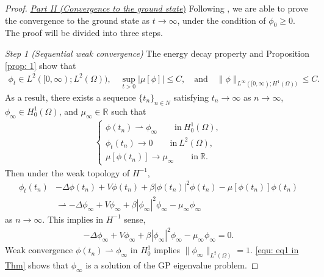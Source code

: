 \documentclass{siamart250211}
\def\R{\mathbb{R}}
\begin{document}
\begin{proof}
\underline{\textit{Part II (Convergence to the ground state})} Following \cite[Proposition 4.1, Corollary 4.2, and Theorem 4.3]{antonelli2024existence}, we are able to prove the convergence to the ground state as $t \to \infty$, under the condition of $\phi_0\geq 0$. The proof will be divided into three steps.

\textit{Step 1 (Sequential weak convergence)} The energy decay property and Proposition \ref{prop: 1} show that
\begin{align*}
    \phi_t\in L^2([0,\infty);L^2(\Omega)), \quad 
    \sup_{t>0}|\mu[\phi]|\leq C, \quad 
    \text{and} \quad \|\phi\|_{L^\infty([0,\infty);H^1(\Omega))} \le C.
\end{align*}
As a result, there exists a sequence $\{ t_n\}_{n\in N}$ satisfying $t_n\to \infty $ as $n\to \infty$, $\phi_{\infty} \in H_0^1(\Omega)$, and $\mu_{\infty} \in \R$ such that
\begin{align*}
    \begin{cases}
        \phi(t_n)\rightharpoonup \phi_{\infty} \qquad\text{in} \ H_0^1(\Omega), \\
        \phi_t(t_n) \to 0  \qquad\text{in} \ L^2(\Omega), \\
        \mu[\phi(t_n)]  \to \mu_{\infty} \qquad \text{in} \ \R.
    \end{cases}
\end{align*}
Then under the weak topology of $H^{-1}$, 
\begin{align*}
    \phi_t(t_n)& - \Delta\phi(t_n) + V\phi(t_n) + \beta|\phi(t_n)|^2\phi(t_n) - \mu[\phi(t_n)]\phi(t_n) \\
    & \rightharpoonup - \Delta\phi_{\infty} + V\phi_{\infty} + \beta|\phi_{\infty}|^2\phi_{\infty} - \mu_{\infty}\phi_{\infty}
\end{align*}
as $n \to \infty$. This implies in $H^{-1}$ sense, 
\begin{align}\label{equ: eq1 in Thm}
    - \Delta\phi_{\infty} + V\phi_{\infty} + \beta|\phi_{\infty}|^2\phi_{\infty} - \mu_{\infty}\phi_{\infty} = 0.
\end{align}
Weak convergence $\phi(t_n) \rightharpoonup \phi_{\infty}$ in $H_0^1$ implies $\|\phi_{\infty}\|_{L^2(\Omega)} = 1$. \eqref{equ: eq1 in Thm} shows that $\phi_{\infty}$ is a solution of the GP eigenvalue problem.


\end{proof}
\end{document}
